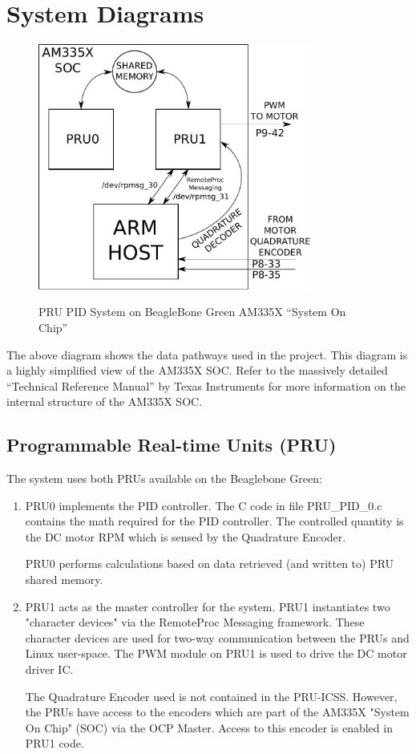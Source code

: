 \chapter{System Diagrams}

\begin{figure}[H]
	\centering
	\includegraphics[width=0.8\textwidth]{diagrams/soc_system}
	\centering\bfseries
	\caption{PRU PID System on BeagleBone Green AM335X ``System On Chip''}
\end{figure}

The above diagram shows the data pathways used in the project.  This diagram is a highly simplified view of the AM335X SOC.  Refer to the massively detailed ``Technical Reference Manual'' by Texas Instruments for more information on the internal structure of the AM335X SOC.

\section{Programmable Real-time Units (PRU)}

The system uses both PRUs available on the Beaglebone Green:

\begin{enumerate}
\item 

PRU0 implements the PID controller.  The C code in file PRU\_PID\_0.c contains
the math required for the PID controller.  The controlled quantity is the DC motor RPM which is sensed by the Quadrature Encoder.

PRU0 performs calculations based on data retrieved (and written to) PRU shared memory.
\item 
PRU1 acts as the master controller for the system.  PRU1 instantiates two "character devices" via the RemoteProc Messaging framework.  These character devices are used for two-way communication between the PRUs and Linux user-space.  The PWM module on PRU1 is used to drive the DC motor driver IC.

The Quadrature Encoder used is not contained in the PRU-ICSS.  However, the PRUs have access to the encoders which are part of the AM335X "System On Chip" (SOC) via the OCP Master.  Access to this encoder is enabled in PRU1 code.
\end{enumerate}

